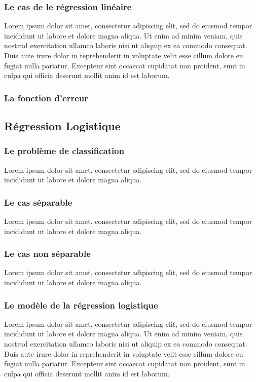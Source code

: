 	\subsubsection{Le cas de le régression linéaire}
		Lorem ipsum dolor sit amet, consectetur adipiscing elit, sed do eiusmod tempor incididunt ut labore et dolore magna aliqua. Ut enim ad minim veniam, quis nostrud exercitation ullamco laboris nisi ut aliquip ex ea commodo consequat. Duis aute irure dolor in reprehenderit in voluptate velit esse cillum dolore eu fugiat nulla pariatur. Excepteur sint occaecat cupidatat non proident, sunt in culpa qui officia deserunt mollit anim id est laborum.
	\subsubsection{La fonction d'erreur}
	
	
	\subsection{Régression Logistique}
	\subsubsection{Le problème de classification}
		Lorem ipsum dolor sit amet, consectetur adipiscing elit, sed do eiusmod tempor incididunt ut labore et dolore magna aliqua.
	\subsubsection{Le cas séparable }
		Lorem ipsum dolor sit amet, consectetur adipiscing elit, sed do eiusmod tempor incididunt ut labore et dolore magna aliqua.
	\subsubsection{Le cas non séparable }
		Lorem ipsum dolor sit amet, consectetur adipiscing elit, sed do eiusmod tempor incididunt ut labore et dolore magna aliqua.
	\subsubsection{Le modèle de la régression logistique }
		Lorem ipsum dolor sit amet, consectetur adipiscing elit, sed do eiusmod tempor incididunt ut labore et dolore magna aliqua. Ut enim ad minim veniam, quis nostrud exercitation ullamco laboris nisi ut aliquip ex ea commodo consequat. Duis aute irure dolor in reprehenderit in voluptate velit esse cillum dolore eu fugiat nulla pariatur. Excepteur sint occaecat cupidatat non proident, sunt in culpa qui officia deserunt mollit anim id est laborum.
		
